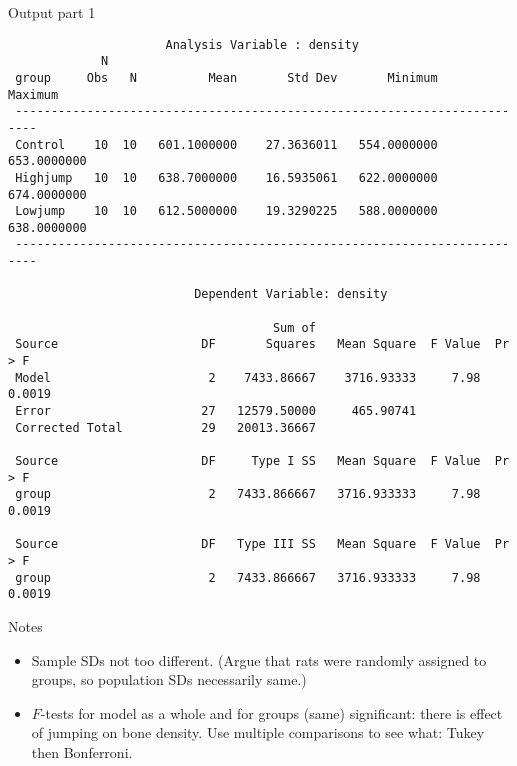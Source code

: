 \documentclass[pdf]{prosper}
\begin{document}
\begin{slide}{Output part 1}

{\scriptsize
\begin{verbatim}
                      Analysis Variable : density
             N
 group     Obs   N          Mean       Std Dev       Minimum       Maximum
 -------------------------------------------------------------------------
 Control    10  10   601.1000000    27.3636011   554.0000000   653.0000000
 Highjump   10  10   638.7000000    16.5935061   622.0000000   674.0000000
 Lowjump    10  10   612.5000000    19.3290225   588.0000000   638.0000000
 -------------------------------------------------------------------------

                          Dependent Variable: density   

                                     Sum of
 Source                    DF       Squares   Mean Square  F Value  Pr > F
 Model                      2    7433.86667    3716.93333     7.98  0.0019
 Error                     27   12579.50000     465.90741                 
 Corrected Total           29   20013.36667                               

 Source                    DF     Type I SS   Mean Square  F Value  Pr > F
 group                      2   7433.866667   3716.933333     7.98  0.0019

 Source                    DF   Type III SS   Mean Square  F Value  Pr > F
 group                      2   7433.866667   3716.933333     7.98  0.0019

\end{verbatim}
}

\end{slide}

\begin{slide}{Notes}

  \begin{itemize}
  \item 
Sample SDs not too different. (Argue that rats were randomly assigned to groups, so population SDs necessarily same.)

\item $F$-tests for model as a whole and for groups (same)
  significant: there is effect of jumping on bone density. Use
  multiple comparisons to see what: Tukey then Bonferroni.
  \end{itemize}
  
\end{slide}
\end{document}
